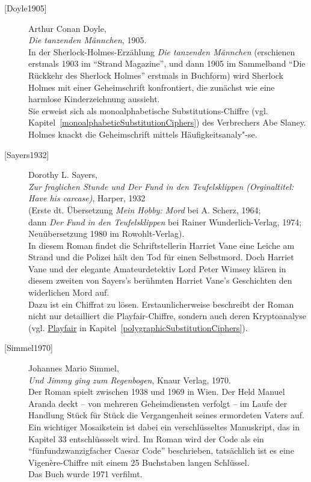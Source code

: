 \begin{description}
\item[\textrm{[Doyle1905]}] 
    Arthur Conan Doyle, \\
    {\em Die tanzenden Männchen}, 1905. \\
    In der Sherlock-Holmes-Erzählung {\em Die tanzenden Männchen}
    (erschienen erstmals 1903 im "`Strand Magazine"', und dann 1905 im
    Sammelband "`Die Rückkehr des Sherlock Holmes"' erstmals in Buchform)
    wird Sherlock Holmes mit einer Geheimschrift konfrontiert, die zunächst
    wie eine harmlose Kinderzeichnung aussieht. \\
    Sie erweist sich als monoalphabetische Substitutions-Chiffre (vgl.
    Kapitel~\ref{monoalphabeticSubstitutionCiphers}) des Verbrechers Abe
    Slaney. Holmes knackt die Geheimschrift mittels Häufigkeitsanaly"-se.\\


\item[\textrm{[Sayers1932]}] 
    Dorothy L. Sayers, \\
    {\em Zur fraglichen Stunde und Der Fund in den Teufelsklippen
    (Orginaltitel: Have his carcase)}, Harper, 1932 \\
    (Erste dt. Übersetzung {\em Mein Hobby: Mord} bei A. Scherz, 1964; \\
    dann {\em Der Fund in den Teufelsklippen} bei Rainer Wunderlich-Verlag,
    1974;\\
    Neuübersetzung 1980 im Rowohlt-Verlag). \\
    In diesem Roman findet die Schriftstellerin Harriet Vane eine Leiche
    am Strand und die Polizei hält den Tod für einen Selbstmord.
    Doch Harriet Vane und der elegante Amateurdetektiv Lord Peter Wimsey
    klären in diesem zweiten von Sayers's berühmten Harriet Vane's
    Geschichten den widerlichen Mord auf. \\
    Dazu ist ein Chiffrat zu lösen. Erstaunlicherweise beschreibt der
    Roman nicht nur detailliert die Playfair-Chiffre, sondern auch deren
    Kryptoanalyse (vgl. \hyperlink{playfair}{Playfair}
    in Kapitel~\ref{polygraphicSubstitutionCiphers}).\\


\item[\textrm{[Simmel1970]}] 
    Johannes Mario Simmel, \\
    {\em Und Jimmy ging zum Regenbogen}, Knaur Verlag, 1970. \\
    Der Roman spielt zwischen 1938 und
    1969 in Wien. Der Held Manuel Aranda deckt -- von mehreren Geheimdiensten
    verfolgt -- im Laufe der Handlung Stück für Stück die Vergangenheit seines
    ermordeten Vaters auf. Ein wichtiger Mosaikstein ist dabei ein
    verschlüsseltes Manuskript, das in Kapitel 33 entschlüssselt wird.
    Im Roman wird der Code als ein
    "`fünfundzwanzigfacher Caesar Code"' beschrieben, tatsächlich ist es eine
    Vigenère-Chiffre mit einem 25 Buchstaben langen Schlüssel. \\
    Das Buch wurde 1971 verfilmt.\\



\end{description}
